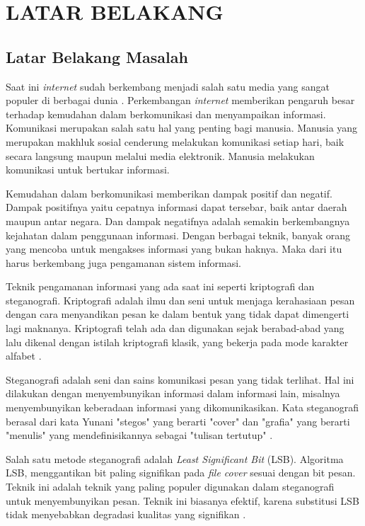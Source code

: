 
\chapter{LATAR BELAKANG}

\section{Latar Belakang Masalah}
Saat ini \emph{internet} sudah berkembang menjadi salah satu media yang sangat populer di berbagai dunia \cite{bunyamin}. Perkembangan \emph{internet} memberikan pengaruh besar terhadap kemudahan dalam berkomunikasi dan menyampaikan informasi. Komunikasi merupakan salah satu hal yang penting bagi manusia. Manusia yang merupakan makhluk sosial cenderung melakukan komunikasi setiap hari, baik secara langsung maupun melalui media elektronik. Manusia melakukan komunikasi untuk bertukar informasi.

Kemudahan dalam berkomunikasi memberikan dampak positif dan negatif. Dampak positifnya yaitu cepatnya informasi dapat tersebar, baik antar daerah maupun antar negara. Dan dampak negatifnya adalah semakin berkembangnya kejahatan dalam penggunaan informasi. Dengan berbagai teknik, banyak orang yang mencoba untuk mengakses informasi yang bukan haknya. Maka dari itu harus berkembang juga pengamanan sistem informasi.

Teknik pengamanan informasi yang ada saat ini seperti kriptografi dan steganografi. Kriptografi adalah ilmu dan seni untuk menjaga kerahasiaan pesan dengan cara menyandikan pesan  ke dalam bentuk yang tidak dapat dimengerti lagi maknanya. Kriptografi telah ada dan digunakan sejak berabad-abad yang lalu dikenal dengan istilah kriptografi klasik, yang bekerja pada mode karakter alfabet  \cite{rakhmat}.

Steganografi adalah seni dan sains komunikasi pesan yang tidak terlihat. Hal ini dilakukan dengan menyembunyikan informasi dalam informasi lain, misalnya menyembunyikan keberadaan informasi yang dikomunikasikan. Kata steganografi berasal dari kata Yunani "stegos" yang berarti "cover" dan "grafia" yang berarti "menulis" yang mendefinisikannya sebagai "tulisan tertutup" \cite{kavitha}.

Salah satu metode steganografi adalah \emph{Least Significant Bit} (LSB). Algoritma LSB, menggantikan bit paling signifikan pada \emph{file cover} sesuai dengan bit pesan. Teknik ini adalah teknik yang paling populer digunakan dalam steganografi untuk menyembunyikan pesan. Teknik ini biasanya efektif, karena substitusi LSB tidak menyebabkan degradasi kualitas yang signifikan \cite{joshi}.

